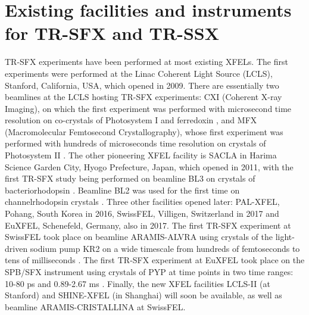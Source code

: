 \section{Existing facilities and instruments for TR-SFX and TR-SSX}\label{sec:existingfacilities}
TR-SFX experiments have been performed at most existing XFELs. The first experiments were performed at the Linac Coherent Light Source (LCLS), Stanford, California, USA, which opened in 2009. There are essentially two beamlines at the LCLS hosting TR-SFX experiments: CXI (Coherent X-ray Imaging), on which the first experiment was performed with microsecond time resolution on co-crystals of Photosystem I and ferredoxin \parencite{aquilaTimeresolvedProteinNanocrystallography2012}, and MFX (Macromolecular Femtosecond Crystallography), whose first experiment was performed with hundreds of microseconds time resolution on crystals of Photosystem II \parencite{kernStructuresIntermediatesKok2018}. The other pioneering XFEL facility is SACLA in Harima Science Garden City, Hyogo Prefecture, Japan, which opened in 2011, with the first TR-SFX study being performed on beamline BL3 on crystals of bacteriorhodopsin \parencite{nangoThreedimensionalMovieStructural2016}. Beamline BL2 was used for the first time on channelrhodopsin crystals \parencite{odaTimeresolvedSerialFemtosecond2021}. Three other facilities opened later: PAL-XFEL, Pohang, South Korea in 2016, SwissFEL, Villigen, Switzerland in 2017 and EuXFEL, Schenefeld, Germany, also in 2017. The first TR-SFX experiment at SwissFEL took place on beamline ARAMIS-ALVRA using crystals of the light-driven sodium pump KR2 on a wide timescale from hundreds of femtoseconds to tens of milliseconds \parencite{skopintsevFemtosecondtomillisecondStructuralChanges2020}. The first TR-SFX experiment at EuXFEL took place on the SPB/SFX instrument using crystals of PYP at time points in two time ranges: 10-80 ps and 0.89-2.67 ms \parencite{pandeyTimeresolvedSerialFemtosecond2020}. Finally, the new XFEL facilities LCLS-II (at Stanford) and SHINE-XFEL (in Shanghai) will soon be available, as well as beamline ARAMIS-CRISTALLINA at SwissFEL.

